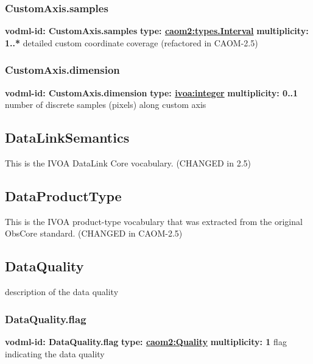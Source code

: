     \subsubsection{CustomAxis.samples}
      \textbf{vodml-id: CustomAxis.samples} \newline
      \textbf{type: \hyperref[sect:types.Interval]{caom2:types.Interval}} \newline
      \textbf{multiplicity: 1..*} \newline
      detailed custom coordinate coverage (refactored in CAOM-2.5)

    \subsubsection{CustomAxis.dimension}
      \textbf{vodml-id: CustomAxis.dimension} \newline
      \textbf{type: \hyperref[sect:ivoa]{ivoa:integer}} \newline
      \textbf{multiplicity: 0..1} \newline
      number of discrete samples (pixels) along custom axis

  \subsection{DataLinkSemantics}
  \label{sect:DataLinkSemantics}
    This is the IVOA DataLink Core vocabulary. (CHANGED in 2.5)

  \subsection{DataProductType}
  \label{sect:DataProductType}
    This is the IVOA product-type vocabulary that was extracted from the original ObsCore standard. (CHANGED in CAOM-2.5)

  \subsection{DataQuality}
  \label{sect:DataQuality}
    description of the data quality

    \subsubsection{DataQuality.flag}
      \textbf{vodml-id: DataQuality.flag} \newline
      \textbf{type: \hyperref[sect:Quality]{caom2:Quality}} \newline
      \textbf{multiplicity: 1} \newline
      flag indicating the data quality

